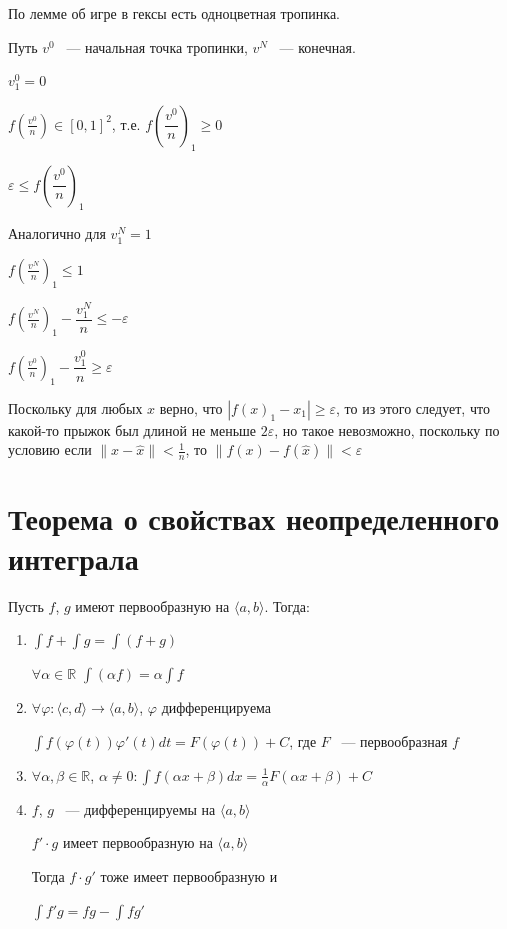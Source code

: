 \documentclass{article}
\begin{document}
			По лемме об игре в гексы есть одноцветная тропинка.
				
			Путь $v^0$ ~--- начальная точка тропинки, $v^N$ ~--- конечная.
				
			$v^0_1 = 0$
				
			$f\left(\frac{v^0}{n}\right) \in [0, 1]^2$, т.е. $f\left(\dfrac{v^0}{n}\right)_1 \geq 0$
				
			$\varepsilon \leq f\left(\dfrac{v^0}{n}\right)_1$
				
			Аналогично для $v^N_1 = 1$
				
			$f\left(\frac{v^N}{n}\right)_1 \leq 1$
				
			$f\left(\frac{v^N}{n}\right)_1 - \dfrac{v^N_1}{n} \leq -\varepsilon$
				
			$f\left(\frac{v^0}{n}\right)_1 - \dfrac{v^0_1}{n} \geq \varepsilon$
	
			Поскольку для любых $x$ верно, что $|f(x)_1 - x_1| \geq \varepsilon$, то из этого следует, что какой-то прыжок был длиной не меньше $2 \varepsilon$, но такое невозможно, поскольку по условию если $\| x - \widehat{x} \| < \frac{1}{n}$, то $\| f(x) - f(\widehat{x}) \| < \varepsilon$
				
				
	\newpage

	\section{Теорема о свойствах неопределенного интеграла}
	
		Пусть $f$, $g$ имеют первообразную на $\langle a, b \rangle$. Тогда:
		
		\begin{enumerate}
		
			\item $\int f + \int g  = \int (f + g)$
			
				$\forall \alpha \in \mathbb{R}$ $\int(\alpha f) = \alpha \int{f}$
				
			\item $\forall \varphi: \langle c, d \rangle \rightarrow \langle a, b \rangle$, $\varphi$ дифференцируема
			
				$\int f(\varphi(t))\varphi'(t)dt = F(\varphi(t)) + C$, где $F$ ~--- первообразная $f$
				
			\item $\forall \alpha, \beta \in \mathbb{R}$, $\alpha \neq 0 : \int f(\alpha x + \beta)dx = \frac{1}{\alpha} F(\alpha x + \beta) + C$
			
			\item $f$, $g$ ~--- дифференцируемы на $\langle a, b \rangle$
			
				$f' \cdot g$ имеет первообразную на $\langle a, b \rangle$
				
				Тогда $f \cdot g'$ тоже имеет первообразную и 
				
				$\int f'g = fg - \int fg'$
				
		\end{enumerate}
			
\end{document}
